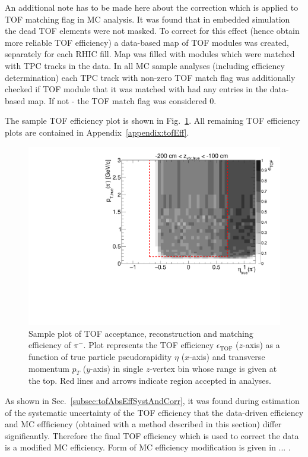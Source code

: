 An additional note has to be made here about the correction which is applied to TOF matching flag in MC analysis. It was found that in embedded simulation the dead TOF elements were not masked. To correct for this effect (hence obtain more reliable TOF efficiency) a data-based map of TOF modules was created, separately for each RHIC fill. Map was filled with modules which were matched with TPC tracks in the data. In all MC sample analyses (including efficiency determination) each TPC track with non-zero TOF match flag was additionally checked if TOF module that it was matched with had any entries in the data-based map. If not - the TOF match flag was considered 0.

The sample TOF efficiency plot is shown in Fig.~\ref{fig:tofEff_pion_sample}. All remaining TOF efficiency plots are contained in Appendix~\ref{appendix:tofEff}.

\begin{figure}[hb]%
\centering\includegraphics[width=0.7\linewidth,page=11]{graphics/eff/Eff2D_TOF_pion_Minus.pdf}%
\caption[Sample plot of TOF acceptance, reconstruction and matching efficiency of $\pi^{-}$.]{Sample plot of TOF acceptance, reconstruction and matching efficiency of $\pi^{-}$. Plot represents the TOF efficiency $\epsilon_{\text{TOF}}$ ($z$-axis) as a function of true particle pseudorapidity $\eta$ ($x$-axis) and transverse momentum $p_{T}$ ($y$-axis) in single $z$-vertex bin whose range is given at the top. Red lines and arrows indicate region accepted in analyses.}\label{fig:tofEff_pion_sample}
\end{figure}

As shown in Sec.~\ref{subsec:tofAbsEffSystAndCorr}, it was found during estimation of the systematic uncertainty of the TOF efficiency that the data-driven efficiency and MC effficiency (obtained with a method described in this section) differ significantly. Therefore the final TOF efficiency which is used to correct the data is a modified MC efficiency. Form of MC efficiency modification is given in ... .

